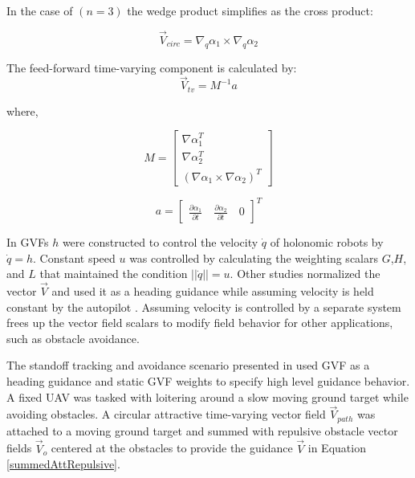 \documentclass[numbered,pdftex]{ohio-etd}
\begin{document}
\noindent
In the case of $(n=3)$ the wedge product simplifies as the cross product:

\begin{equation}
\overrightarrow{V}_{circ} =  \nabla_q\alpha_1 \times \nabla_q\alpha_2 
\label{circOnlySimp}
\end{equation}

\noindent
The feed-forward time-varying component is calculated by:
\begin{equation}
\label{tv}
\overrightarrow{V}_{tv} = M^{-1}a
\end{equation}

\noindent
where,

\begin{equation}
\label{mMatrix}
M =\begin{bmatrix}
\nabla\alpha_1^T \\
\nabla\alpha_2^T \\
(\nabla\alpha_1 \times \nabla\alpha_2)^T
\end{bmatrix}
\end{equation}

\begin{equation}
\label{aVector}
a =\begin{bmatrix}
\frac{\partial \alpha_1}{\partial t} \quad   \frac{\partial \alpha_2}{\partial t} \quad   0
\end{bmatrix}^T
\end{equation}


In \cite{goncalves_artificial_2009,goncalves_circulation_2010,goncalves_vector_2010} GVFs $h$ were constructed to control the velocity $\dot{q}$ of holonomic robots by $\dot{q}=h$. Constant speed  $u$ was controlled by calculating the weighting scalars $G$,$H$, and $L$ that maintained the condition $||\dot{q}|| = u$. Other studies normalized the vector $\overrightarrow{V}$ and used it as a heading guidance while assuming velocity is held constant by the autopilot \cite{gerlach_autonomous_2014,wwc}. Assuming velocity is controlled by a separate system frees up the vector field scalars to modify field behavior for other applications, such as obstacle avoidance. 
 
 
 The standoff tracking and avoidance scenario presented in \cite{wwc} used GVF as a heading guidance and static GVF weights to specify high level guidance behavior. A fixed UAV was tasked with loitering around a slow moving ground target while avoiding obstacles. A circular attractive time-varying vector field $\overrightarrow{V}_{path}$ was attached to a moving ground target and summed with repulsive obstacle vector fields $\overrightarrow{V}_{o}$ centered at the obstacles to provide the guidance $\overrightarrow{V}$ in Equation \ref{summedAttRepulsive}. 
 
\end{document}
